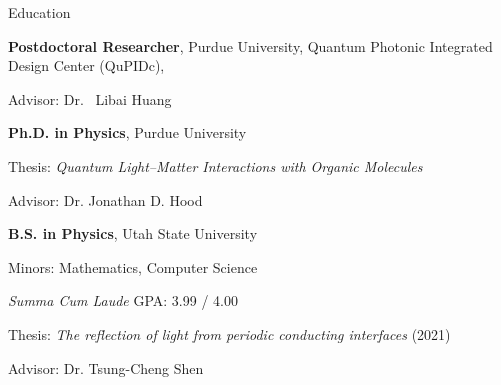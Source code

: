 \begin{rubric}{Education}

\entry*[2026 -- Present]%
    \textbf{Postdoctoral Researcher}, Purdue University, Quantum Photonic Integrated Design Center (QuPIDc), 
    \par Advisor: Dr. \ Libai Huang

\entry*[2021 -- 2025]%
    \textbf{Ph.D. in Physics}, Purdue University
    \par Thesis: \emph{Quantum Light--Matter Interactions with Organic Molecules}
    \par Advisor: Dr. Jonathan D. Hood

\entry*[2017 -- 2021]%
    \textbf{B.S. in Physics}, Utah State University
    \par Minors: Mathematics, Computer Science 
    \par \textit{Summa Cum Laude} \quad GPA: 3.99 / 4.00
    \par Thesis: \emph{The reflection of light from periodic conducting interfaces} (2021)
    \par Advisor: Dr. Tsung-Cheng Shen

\end{rubric}